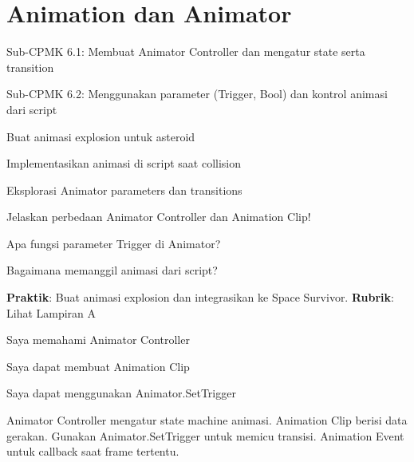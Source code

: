 \documentclass[../main]{subfiles}
\begin{document}
\chapter{Animation dan Animator}

\begin{subcpmk}
  \item Sub-CPMK 6.1: Membuat Animator Controller dan mengatur state serta transition
  \item Sub-CPMK 6.2: Menggunakan parameter (Trigger, Bool) dan kontrol animasi dari script
\end{subcpmk}




\begin{aktivitas}
  \item Buat animasi explosion untuk asteroid
  \item Implementasikan animasi di script saat collision
  \item Eksplorasi Animator parameters dan transitions
\end{aktivitas}

\begin{latihan}
  \item Jelaskan perbedaan Animator Controller dan Animation Clip!
  \item Apa fungsi parameter Trigger di Animator?
  \item Bagaimana memanggil animasi dari script?
\end{latihan}

\begin{asesmen}
\textbf{Praktik}: Buat animasi explosion dan integrasikan ke Space Survivor.
\textbf{Rubrik}: Lihat Lampiran A
\end{asesmen}

\begin{checklist}
  \item Saya memahami Animator Controller
  \item Saya dapat membuat Animation Clip
  \item Saya dapat menggunakan Animator.SetTrigger
\end{checklist}

\begin{rangkuman}
Animator Controller mengatur state machine animasi. Animation Clip berisi data gerakan. Gunakan Animator.SetTrigger untuk memicu transisi. Animation Event untuk callback saat frame tertentu.
\end{rangkuman}

\ifSubfilesClassLoaded{
  \renewcommand{\bibname}{Daftar Pustaka}
  
  
}{}
\end{document}
